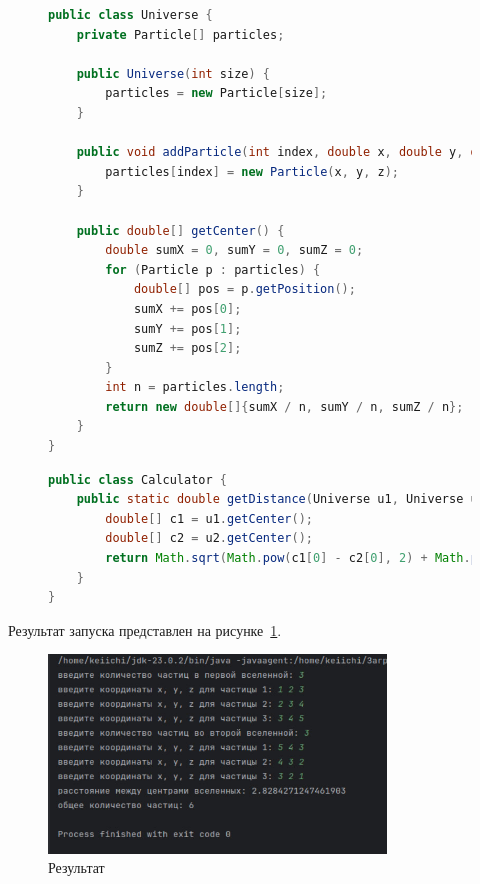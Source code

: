 \documentclass[a4paper, 14pt]{extarticle}
\begin{document}
\begin{figure}[!htb]
\begin{lstlisting}[language={java},caption={Файл Universe.java},label={lst:code3}]
public class Universe {
    private Particle[] particles;

    public Universe(int size) {
        particles = new Particle[size];
    }

    public void addParticle(int index, double x, double y, double z) {
        particles[index] = new Particle(x, y, z);
    }

    public double[] getCenter() {
        double sumX = 0, sumY = 0, sumZ = 0;
        for (Particle p : particles) {
            double[] pos = p.getPosition();
            sumX += pos[0];
            sumY += pos[1];
            sumZ += pos[2];
        }
        int n = particles.length;
        return new double[]{sumX / n, sumY / n, sumZ / n};
    }
}
\end{lstlisting}
\end{figure}





\begin{figure}[!htb]
\begin{lstlisting}[language={java},caption={Файл Particle.java},label={lst:code4}]
public class Calculator {
    public static double getDistance(Universe u1, Universe u2) {
        double[] c1 = u1.getCenter();
        double[] c2 = u2.getCenter();
        return Math.sqrt(Math.pow(c1[0] - c2[0], 2) + Math.pow(c1[1] - c2[1], 2) + Math.pow(c1[2] - c2[2], 2));
    }
}

\end{lstlisting}
\end{figure}

Результат запуска представлен на рисунке~\ref{fig:img1}.

\begin{figure}[!htb]
	\centering
	\includegraphics[width=0.8\textwidth]{img1}
\caption{Результат}
\label{fig:img1}
\end{figure}
\end{document}
